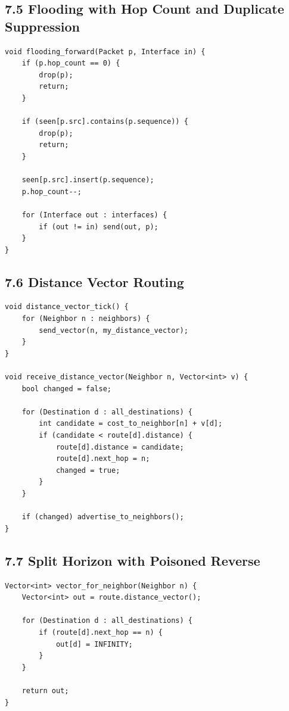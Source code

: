 \documentclass[11pt]{article}
\begin{document}
\subsection{7.5 Flooding with Hop Count and Duplicate
Suppression}\label{flooding-with-hop-count-and-duplicate-suppression}

\begin{verbatim}
void flooding_forward(Packet p, Interface in) {
    if (p.hop_count == 0) {
        drop(p);
        return;
    }

    if (seen[p.src].contains(p.sequence)) {
        drop(p);
        return;
    }

    seen[p.src].insert(p.sequence);
    p.hop_count--;

    for (Interface out : interfaces) {
        if (out != in) send(out, p);
    }
}
\end{verbatim}

\subsection{7.6 Distance Vector Routing}\label{distance-vector-routing}

\begin{verbatim}
void distance_vector_tick() {
    for (Neighbor n : neighbors) {
        send_vector(n, my_distance_vector);
    }
}

void receive_distance_vector(Neighbor n, Vector<int> v) {
    bool changed = false;

    for (Destination d : all_destinations) {
        int candidate = cost_to_neighbor[n] + v[d];
        if (candidate < route[d].distance) {
            route[d].distance = candidate;
            route[d].next_hop = n;
            changed = true;
        }
    }

    if (changed) advertise_to_neighbors();
}
\end{verbatim}

\subsection{7.7 Split Horizon with Poisoned
Reverse}\label{split-horizon-with-poisoned-reverse}

\begin{verbatim}
Vector<int> vector_for_neighbor(Neighbor n) {
    Vector<int> out = route.distance_vector();

    for (Destination d : all_destinations) {
        if (route[d].next_hop == n) {
            out[d] = INFINITY;
        }
    }

    return out;
}
\end{verbatim}
\end{document}
